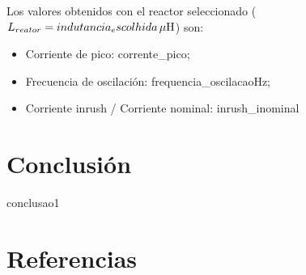 \documentclass[a4paper]{article}
\begin{document}
	Los valores obtenidos con el reactor seleccionado ($L_{reator} = {{indutancia_escolhida}} \, \mu \rm{H} $) son:
	\begin{itemize}[label=\textendash]
		\item Corriente de pico: {{corrente_pico}};
		\item Frecuencia de oscilación: {{frequencia_oscilacao}}Hz;
		\item Corriente inrush / Corriente nominal: {{inrush_inominal}}
	\end{itemize}
	
	\section{Conclusión}
	{{conclusao1}}
	
	\section{Referencias}
	
\end{document}
